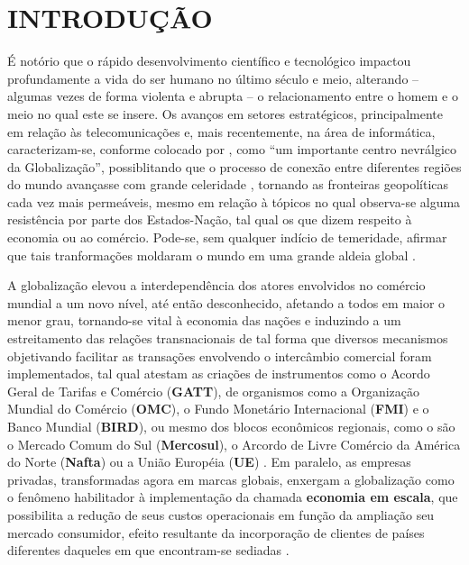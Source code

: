 
\chapter{INTRODUÇÃO}
\label{chap:introducao}


É notório que o rápido desenvolvimento científico e tecnológico impactou profundamente a vida do ser humano no último século e meio, alterando -- algumas vezes de forma violenta e abrupta -- o relacionamento entre o homem e o meio no qual este se insere. Os avanços em setores estratégicos, principalmente em relação às telecomunicações e, mais recentemente, na área de informática, caracterizam-se, conforme colocado por , como ``um importante centro nevrálgico da Globalização'', possiblitando que o processo de conexão entre diferentes regiões do mundo avançasse com grande celeridade \cite{cignacco2012comercio}, tornando as fronteiras geopolíticas cada vez mais permeáveis, mesmo em relação à tópicos no qual observa-se alguma resistência por parte dos Estados-Nação, tal qual os que dizem respeito à economia ou ao comércio. Pode-se, sem qualquer indício de temeridade, afirmar que tais tranformações moldaram o mundo em uma grande aldeia global \cite{cignacco2012comercio}.

A globalização elevou a interdependência dos atores envolvidos no comércio mundial a um novo nível, até então desconhecido, afetando a todos em maior o menor grau, tornando-se vital à economia das nações \cite{segalis2015fundamentos} e induzindo a um estreitamento das relações transnacionais de tal forma que diversos mecanismos objetivando facilitar as transações envolvendo o intercâmbio comercial foram implementados, tal qual atestam as criações de instrumentos como o Acordo Geral de Tarifas e Comércio (\textbf{GATT}), de organismos como a Organização Mundial do Comércio (\textbf{OMC}), o Fundo Monetário Internacional (\textbf{FMI}) e o Banco Mundial (\textbf{BIRD}), ou mesmo dos blocos econômicos regionais, como o são o Mercado Comum do Sul (\textbf{Mercosul}), o Arcordo de Livre Comércio da América do Norte (\textbf{Nafta}) ou a União Européia (\textbf{UE}) \cite{cignacco2012comercio,ludovico2017logistica}. Em paralelo, as empresas privadas, transformadas agora em marcas globais, enxergam a globalização como o fenômeno habilitador à implementação da chamada \textbf{economia em escala}, que possibilita a redução de seus custos operacionais em função da ampliação seu mercado consumidor, efeito resultante da incorporação de clientes de países diferentes daqueles em que encontram-se sediadas \cite{cignacco2012comercio}.

